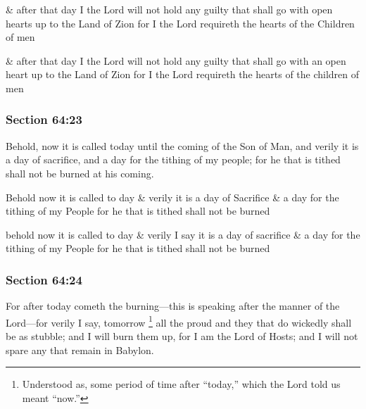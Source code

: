 		\begin{framed}
		\scriptsize
			\begin{compactdesc}
				\item[JSP] \& after that day I the Lord will not hold any guilty that shall go with open hearts up to the Land of Zion for I the Lord requireth the hearts of the Children of men
				\item[Gilbert] \& after that day I the Lord will not hold any guilty that shall go with an open heart up to the Land of Zion for I the Lord requireth the hearts of the children of men
			\end{compactdesc}
		\end{framed}

	\subsubsection{Section 64:23} %
		\label{DC64-23}

		Behold, now it is called today until the coming of the Son of Man, and verily it is a day of sacrifice, and a day for the tithing of my people; for he that is tithed shall not be burned at his coming.

		\begin{framed}
		\scriptsize
			\begin{compactdesc}
				\item[JSP] Behold now it is called to day \& verily it is a day of Sacrifice \& a day for the tithing of my People for he that is tithed shall not be burned
				\item[Gilbert] behold now it is called to day \& verily I say it is a day of sacrifice \& a day for the tithing of my People for he that is tithed shall not be burned
			\end{compactdesc}
		\end{framed}

	\subsubsection{Section 64:24} %
		\label{DC64-24}

		For after today cometh the burning---this is speaking after the manner of the Lord---for verily I say, tomorrow%
			\footnote{%
				Understood as, some period of time after ``today,'' which the Lord told us meant ``now.''
				}
		all the proud and they that do wickedly shall be as stubble; and I will burn them up, for I am the Lord of Hosts; and I will not spare any that remain in Babylon.

